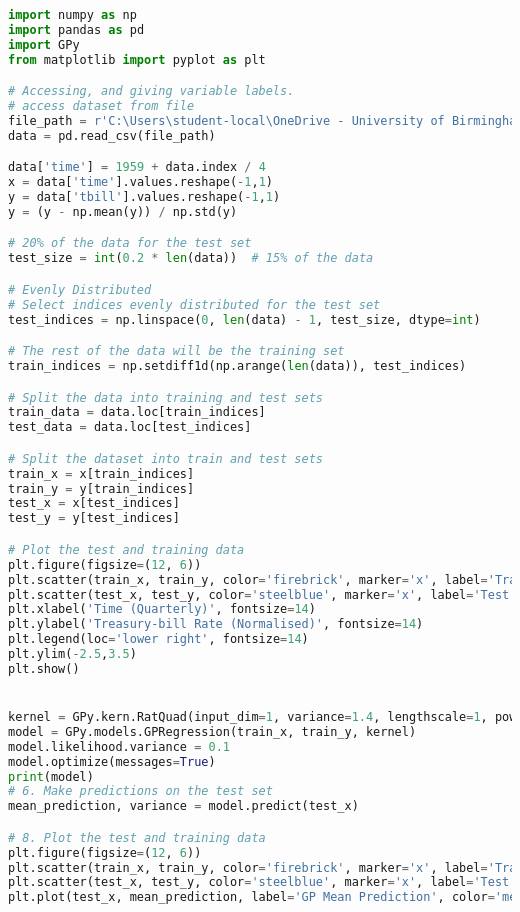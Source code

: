 \documentclass[12pt,a4paper]{article}
\begin{document}
\vspace{10pt}
\begin{lstlisting}[language=python, caption={Code of the Creation of Figures \ref{fig:RQ dataset plot} and \ref{fig:RQ GPregression}}]
import numpy as np
import pandas as pd
import GPy
from matplotlib import pyplot as plt

# Accessing, and giving variable labels.
# access dataset from file
file_path = r'C:\Users\student-local\OneDrive - University of Birmingham\Dissertation\USMacroB.csv'
data = pd.read_csv(file_path)

data['time'] = 1959 + data.index / 4
x = data['time'].values.reshape(-1,1)
y = data['tbill'].values.reshape(-1,1)
y = (y - np.mean(y)) / np.std(y)

# 20% of the data for the test set
test_size = int(0.2 * len(data))  # 15% of the data

# Evenly Distributed
# Select indices evenly distributed for the test set
test_indices = np.linspace(0, len(data) - 1, test_size, dtype=int)

# The rest of the data will be the training set
train_indices = np.setdiff1d(np.arange(len(data)), test_indices)

# Split the data into training and test sets
train_data = data.loc[train_indices]
test_data = data.loc[test_indices]

# Split the dataset into train and test sets
train_x = x[train_indices]  
train_y = y[train_indices]  
test_x = x[test_indices]    
test_y = y[test_indices]

# Plot the test and training data
plt.figure(figsize=(12, 6))
plt.scatter(train_x, train_y, color='firebrick', marker='x', label='Training Data', s=70)
plt.scatter(test_x, test_y, color='steelblue', marker='x', label='Test Data', s=70)
plt.xlabel('Time (Quarterly)', fontsize=14)
plt.ylabel('Treasury-bill Rate (Normalised)', fontsize=14)
plt.legend(loc='lower right', fontsize=14)
plt.ylim(-2.5,3.5)
plt.show()


kernel = GPy.kern.RatQuad(input_dim=1, variance=1.4, lengthscale=1, power=0.1)
model = GPy.models.GPRegression(train_x, train_y, kernel)
model.likelihood.variance = 0.1
model.optimize(messages=True)
print(model)
# 6. Make predictions on the test set
mean_prediction, variance = model.predict(test_x)

# 8. Plot the test and training data
plt.figure(figsize=(12, 6))
plt.scatter(train_x, train_y, color='firebrick', marker='x', label='Training Data', s=70)
plt.scatter(test_x, test_y, color='steelblue', marker='x', label='Test Data', s=70)
plt.plot(test_x, mean_prediction, label='GP Mean Prediction', color='mediumpurple', linewidth=3)


\end{lstlisting}
\end{document}
